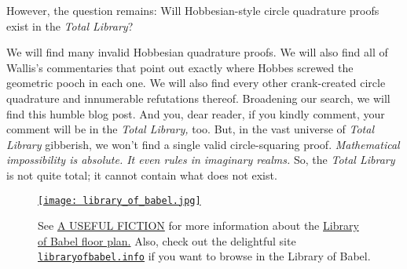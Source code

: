 However, the question remains: Will Hobbesian-style circle quadrature
proofs exist in the \emph{Total Library}?

We will find many invalid Hobbesian quadrature proofs. We will also find
all of Wallis's commentaries that point out exactly where Hobbes screwed
the geometric pooch in each one. We will also find every other
crank-created circle quadrature and innumerable refutations thereof.
Broadening our search, we will find this humble blog post. And you, dear
reader, if you kindly comment, your comment will be in the \emph{Total
Library,} too. But, in the vast universe of \emph{Total Library}
gibberish, we won't find a single valid circle-squaring proof.
\emph{Mathematical impossibility is absolute. It even rules in imaginary
realms.} So, the \emph{Total Library} is not quite total; it cannot
contain what does not exist.


\captionsetup[figure]{labelformat=empty}
\begin{SCfigure}
\centering
\href{https://onehundredpages.wordpress.com/2017/03/23/what-does-jorge-luis-borges-library-of-babel-look-like-an-accurate-illustration-created-with-3d-modeling-software/}{\texttt{[image: library\_of\_babel.jpg]}}
\caption[Library of Babel]{See \href{https://onehundredpages.wordpress.com/}{A USEFUL FICTION} for more information about the
\href{https://onehundredpages.wordpress.com/2017/03/23/what-does-jorge-luis-borges-library-of-babel-look-like-an-accurate-illustration-created-with-3d-modeling-software/}{Library of Babel floor plan.} Also, check out the delightful site
\href{https://libraryofbabel.info/}{\texttt{libraryofbabel.info}} if you want to browse in the Library of Babel.}
\label{fig:8162X0}
\end{SCfigure}


%
 

